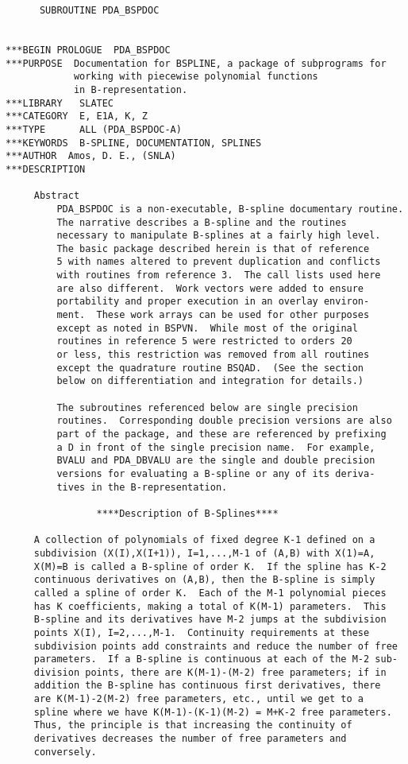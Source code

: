 \begin{verbatim}
      SUBROUTINE PDA_BSPDOC


***BEGIN PROLOGUE  PDA_BSPDOC
***PURPOSE  Documentation for BSPLINE, a package of subprograms for
            working with piecewise polynomial functions
            in B-representation.
***LIBRARY   SLATEC
***CATEGORY  E, E1A, K, Z
***TYPE      ALL (PDA_BSPDOC-A)
***KEYWORDS  B-SPLINE, DOCUMENTATION, SPLINES
***AUTHOR  Amos, D. E., (SNLA)
***DESCRIPTION

     Abstract
         PDA_BSPDOC is a non-executable, B-spline documentary routine.
         The narrative describes a B-spline and the routines
         necessary to manipulate B-splines at a fairly high level.
         The basic package described herein is that of reference
         5 with names altered to prevent duplication and conflicts
         with routines from reference 3.  The call lists used here
         are also different.  Work vectors were added to ensure
         portability and proper execution in an overlay environ-
         ment.  These work arrays can be used for other purposes
         except as noted in BSPVN.  While most of the original
         routines in reference 5 were restricted to orders 20
         or less, this restriction was removed from all routines
         except the quadrature routine BSQAD.  (See the section
         below on differentiation and integration for details.)

         The subroutines referenced below are single precision
         routines.  Corresponding double precision versions are also
         part of the package, and these are referenced by prefixing
         a D in front of the single precision name.  For example,
         BVALU and PDA_DBVALU are the single and double precision
         versions for evaluating a B-spline or any of its deriva-
         tives in the B-representation.

                ****Description of B-Splines****

     A collection of polynomials of fixed degree K-1 defined on a
     subdivision (X(I),X(I+1)), I=1,...,M-1 of (A,B) with X(1)=A,
     X(M)=B is called a B-spline of order K.  If the spline has K-2
     continuous derivatives on (A,B), then the B-spline is simply
     called a spline of order K.  Each of the M-1 polynomial pieces
     has K coefficients, making a total of K(M-1) parameters.  This
     B-spline and its derivatives have M-2 jumps at the subdivision
     points X(I), I=2,...,M-1.  Continuity requirements at these
     subdivision points add constraints and reduce the number of free
     parameters.  If a B-spline is continuous at each of the M-2 sub-
     division points, there are K(M-1)-(M-2) free parameters; if in
     addition the B-spline has continuous first derivatives, there
     are K(M-1)-2(M-2) free parameters, etc., until we get to a
     spline where we have K(M-1)-(K-1)(M-2) = M+K-2 free parameters.
     Thus, the principle is that increasing the continuity of
     derivatives decreases the number of free parameters and
     conversely.


\end{verbatim}
